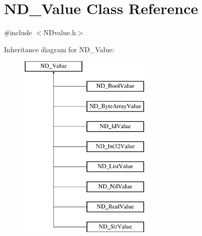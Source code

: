 \hypertarget{class_n_d___value}{\section{N\-D\-\_\-\-Value Class Reference}
\label{class_n_d___value}
}


{\ttfamily \#include $<$N\-Dvalue.\-h$>$}

Inheritance diagram for N\-D\-\_\-\-Value\-:\begin{figure}[H]
\begin{center}
\leavevmode
\includegraphics[height=9.000000cm]{class_n_d___value}
\end{center}
\end{figure}

